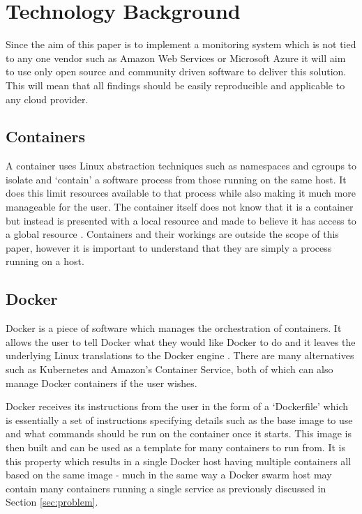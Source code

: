\section{Technology Background}
Since the aim of this paper is to implement a monitoring system which is not tied to any one vendor such as Amazon Web Services or Microsoft Azure it will aim to use only open source and community driven software to deliver this solution. This will mean that all findings should be easily reproducible and applicable to any cloud provider.

\subsection{Containers}
A container uses Linux abstraction techniques such as namespaces and cgroups to isolate and `contain' a software process from those running on the same host. It does this limit resources available to that process while also making it much more manageable for the user. The container itself does not know that it is a container but instead is presented with a local resource and made to believe it has access to a global resource \citep{Kerrisk2013}. Containers and their workings are outside the scope of this paper, however it is important to understand that they are simply a process running on a host.

\subsection{Docker}
Docker is a piece of software which manages the orchestration of containers. It allows the user to tell Docker what they would like Docker to do and it leaves the underlying Linux translations to the Docker engine \citep{docker2016}. There are many alternatives such as Kubernetes and Amazon's Container Service, both of which can also manage Docker containers if the user wishes.

Docker receives its instructions from the user in the form of a `Dockerfile' which is essentially a set of instructions specifying details such as the base image to use and what commands should be run on the container once it starts. This image is then built and can be used as a template for many containers to run from. It is this property which results in a single Docker host having multiple containers all based on the same image - much in the same way a Docker swarm host may contain many containers running a single service as previously discussed in Section \ref{sec:problem}.

